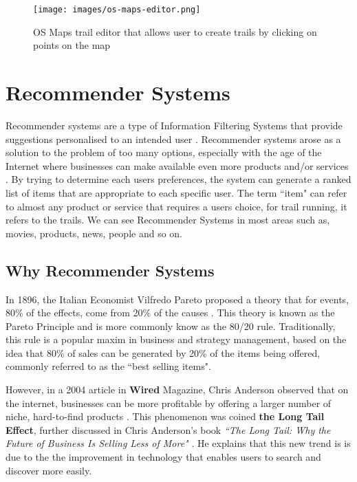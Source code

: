 \begin{figure}[ht]
    \centering
    \texttt{[image: images/os-maps-editor.png]}
    \caption{OS Maps trail editor that allows user to create trails by clicking on points on the map}
    \label{fig:osMapsEditor}
\end{figure}

\section{Recommender Systems} \label{sec:RecSystems}
Recommender systems are a type of Information Filtering Systems that provide suggestions personalised to an intended user \cite{ricci2011introduction}.  Recommender systems arose as a solution to the problem of too many options, especially with the age of the Internet where businesses can make available even more products and/or services \cite{rishabh2019recommender}.  By trying to determine each users preferences, the system can generate a ranked list of items that are appropriate to each specific user.  The term ``item" can refer to almost any product or service that requires a users choice, for trail running, it refers to the trails. We can see  Recommender Systems in most areas such as,  movies,  products, news, people and so on.

\subsection{Why Recommender Systems} \label{subsec:WhyRecSystems}
In 1896, the Italian Economist Vilfredo Pareto proposed a theory that for events, 80\% of the effects, come from 20\% of the causes \cite{sanders1987pareto}. This theory is known as the Pareto Principle and is more commonly know as the 80/20 rule. Traditionally, this rule is a popular maxim in business and strategy management, based on the idea that 80\% of sales can be generated by 20\% of the items being offered, commonly referred to as the ``best selling items".

However, in a 2004 article in \textbf{Wired} Magazine, Chris Anderson observed that on the internet, businesses can be more profitable by offering a larger number of niche, hard-to-find products \cite{brynjolfsson2011goodbye}. This phenomenon was coined \textbf{the Long Tail Effect}, further discussed in Chris Anderson's book \textit{``The Long Tail: Why the Future of Business Is Selling Less of More"} \cite{anderson2006long}. He explains that this new trend is is due to the the improvement in technology that enables users to search and discover more easily. 

